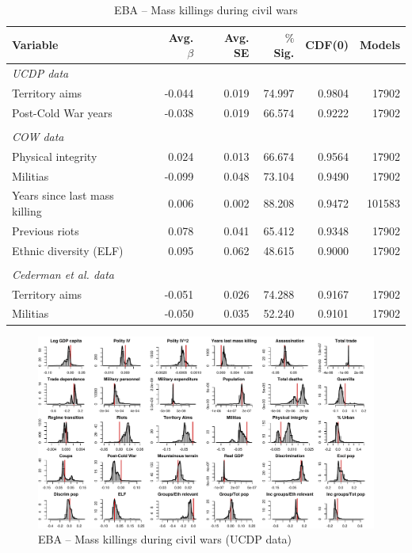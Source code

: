 \begin{table}[H]
\centering
\begin{tabular}{lrrrrr}
\hline
\textbf{Variable} & \textbf{Avg. $\beta$} & \textbf{Avg. SE} & \textbf{$\%$ Sig.} & \textbf{CDF(0)} & \textbf{Models} \\ \hline
\textit{UCDP data} &  &  &  &  &  \\
Territory aims & -0.044 & 0.019 & 74.997 & 0.9804 & 17902 \\
Post-Cold War years & -0.038 & 0.019 & 66.574 & 0.9222 & 17902 \\
 &  &  &  &  &  \\
\textit{COW data} &  &  &  &  &  \\
Physical integrity & 0.024 & 0.013 & 66.674 & 0.9564 & 17902 \\
Militias & -0.099 & 0.048 & 73.104 & 0.9490 & 17902 \\
Years since last mass killing & 0.006 & 0.002 & 88.208 & 0.9472 & 101583 \\
Previous riots & 0.078 & 0.041 & 65.412 & 0.9348 & 17902 \\
Ethnic diversity (ELF) & 0.095 & 0.062 & 48.615 & 0.9000 & 17902 \\
 &  &  &  &  &  \\
\textit{Cederman et al. data} &  &  &  &  &  \\
Territory aims & -0.051 & 0.026 & 74.288 & 0.9167 & 17902 \\
Militias & -0.050 & 0.035 & 52.240 & 0.9101 & 17902 \\ \hline
\end{tabular}
\caption{EBA -- Mass killings during civil wars}
\label{tab:ucdp1}
\end{table}

\clearpage
\begin{figure}
    \centering
    \includegraphics[width=\textwidth]{images/mk-ucdp.pdf}
    \caption{EBA -- Mass killings during civil wars (UCDP data)}
    \label{fig:mk-ucdp}
\end{figure}
\clearpage

